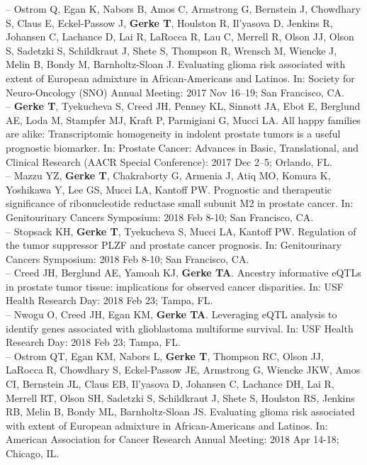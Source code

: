 \documentclass[11pt, a4paper]{article} %
\begin{document}
-- Ostrom Q, Egan K, Nabors B, Amos C, Armstrong G, Bernstein J, Chowdhary S, Claus E, Eckel-Passow J, {\bf Gerke T}, Houlston R, Il'yasova D, Jenkins R, Johansen C, Lachance D, Lai R, LaRocca R, Lau C, Merrell R, Olson JJ, Olson S, Sadetzki S, Schildkraut J, Shete S, Thompson R, Wrensch M, Wiencke J, Melin B, Bondy M, Barnholtz-Sloan J. Evaluating glioma risk associated with extent of European admixture in African-Americans and Latinos. In: Society for Neuro-Oncology (SNO) Annual Meeting: 2017 Nov 16--19; San Francisco, CA.\\

-- {\bf Gerke T}, Tyekucheva S, Creed JH, Penney KL, Sinnott JA, Ebot E, Berglund AE, Loda M, Stampfer MJ, Kraft P, Parmigiani G, Mucci LA. All happy families are alike: Transcriptomic homogeneity in indolent prostate tumors is a useful prognostic biomarker. In: Prostate Cancer: Advances in Basic, Translational, and Clinical Research (AACR Special Conference): 2017 Dec 2--5; Orlando, FL.\\

-- Mazzu YZ, {\bf Gerke T}, Chakraborty G, Armenia J, Atiq MO, Komura K, Yoshikawa Y, Lee GS, Mucci LA, Kantoff PW. Prognostic and therapeutic significance of ribonucleotide reductase small subunit M2 in prostate cancer. In: Genitourinary Cancers Symposium: 2018 Feb 8-10; San Francisco, CA.\\

-- Stopsack KH, {\bf Gerke T}, Tyekucheva S, Mucci LA, Kantoff PW. Regulation of the tumor suppressor PLZF and prostate cancer prognosis. In: Genitourinary Cancers Symposium: 2018 Feb 8-10; San Francisco, CA.\\

-- Creed JH, Berglund AE, Yamoah KJ, {\bf Gerke TA}. Ancestry informative eQTLs in prostate tumor tissue: implications for observed cancer disparities. In: USF Health Research Day: 2018 Feb 23; Tampa, FL. \\

-- Nwogu O, Creed JH, Egan KM, {\bf Gerke TA}. Leveraging eQTL analysis to identify genes associated with glioblastoma multiforme survival. In: USF Health Research Day: 2018 Feb 23; Tampa, FL. \\

-- Ostrom QT, Egan KM, Nabors L, {\bf Gerke T}, Thompson RC, Olson JJ, LaRocca R, Chowdhary S, Eckel-Passow JE, Armstrong G, Wiencke JKW, Amos CI, Bernstein JL, Claus EB, Il'yasova D, Johansen C, Lachance DH, Lai R, Merrell RT, Olson SH, Sadetzki S, Schildkraut J, Shete S, Houlston RS, Jenkins RB, Melin B, Bondy ML, Barnholtz-Sloan JS. Evaluating glioma risk associated with extent of European admixture in African-Americans and Latinos. In: American Association for Cancer Research Annual Meeting: 2018 Apr 14-18; Chicago, IL.\\
\end{document}
